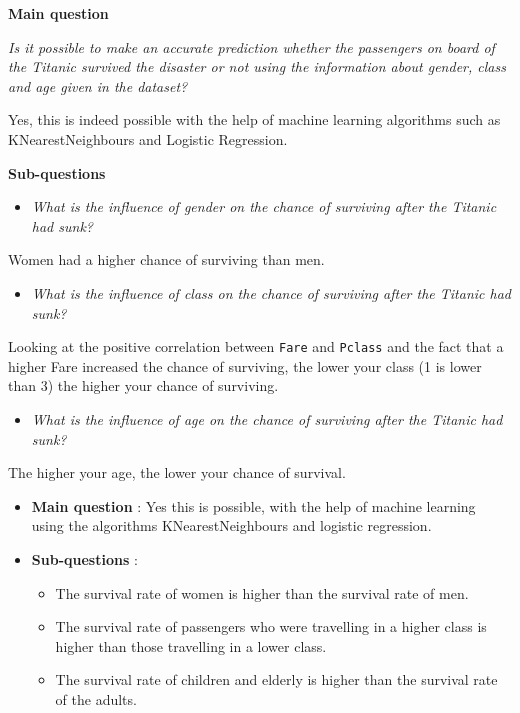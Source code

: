 \documentclass[11pt]{article}
\begin{document}
\textbf{Main question}

\emph{Is it possible to make an accurate prediction whether the passengers on board of the Titanic survived the disaster or not using the information about gender, class and age given in the dataset?}

Yes, this is indeed possible with the help of machine learning algorithms such as KNearestNeighbours and Logistic Regression. 

\textbf{Sub-questions} 

\begin{itemize}
\item \emph{What is the influence of gender on the chance of surviving after the Titanic had sunk?}
\end{itemize}
Women had a higher chance of surviving than men. 


\begin{itemize}
\item \emph{What is the influence of class on the chance of surviving after the Titanic had sunk?}
\end{itemize}
Looking at the positive correlation between \texttt{Fare} and \texttt{Pclass} and the fact that a higher Fare increased the chance of surviving, the lower your class (1 is lower than 3) the higher your chance of surviving. 

\begin{itemize}
\item \emph{What is the influence of age on the chance of surviving after the Titanic had sunk?}
\end{itemize}
The higher your age, the lower your chance of survival. 



\begin{itemize}
\item \textbf{Main question} : Yes this is possible, with the help of machine learning using the algorithms KNearestNeighbours and logistic regression.
\item \textbf{Sub-questions} :

\begin{itemize}
\item The survival rate of women is higher than the survival rate of men.
\item The survival rate of passengers who were travelling in a higher class is higher than those travelling in a lower class.
\item The survival rate of children and elderly is higher than the survival rate of the adults.
\end{itemize}
\end{itemize}
\end{document}
